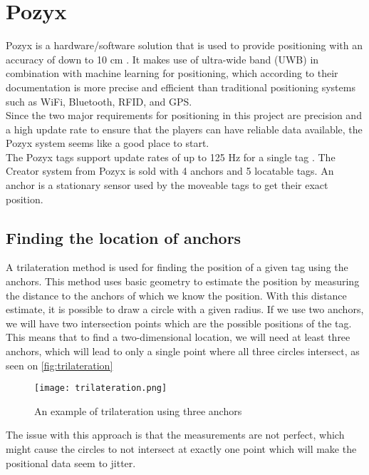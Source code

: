 \section{Pozyx}
Pozyx is a hardware/software solution that is used to provide positioning with an accuracy of down to 10 cm \cite{pozyx}.
It makes use of ultra-wide band (UWB) in combination with machine learning for positioning, which according to their documentation is more precise and efficient than traditional positioning systems such as WiFi, Bluetooth, RFID, and GPS.
\\
Since the two major requirements for positioning in this project are precision and a high update rate to ensure that the players can have reliable data available, the Pozyx system seems like a good place to start.
\\
The Pozyx tags support update rates of up to 125 Hz for a single tag \cite{pozyx}.
The Creator system from Pozyx is sold with 4 anchors and 5 locatable tags.
An anchor is a stationary sensor used by the moveable tags to get their exact position.
\subsection{Finding the location of anchors}
A trilateration method is used for finding the position of a given tag using the anchors.
This method uses basic geometry to estimate the position by measuring the distance to the anchors of which we know the position.
With this distance estimate, it is possible to draw a circle with a given radius.
If we use two anchors, we will have two intersection points which are the possible positions of the tag.
This means that to find a two-dimensional location, we will need at least three anchors, which will lead to only a single point where all three circles intersect, as seen on \autoref{fig:trilateration}

\begin{figure}[H]
    \centering
    \texttt{[image: trilateration.png]}
    \caption{An example of trilateration using three anchors}
    \label{fig:trilateration}
\end{figure}

The issue with this approach is that the measurements are not perfect, which might cause the circles to not intersect at exactly one point which will make the positional data seem to jitter.

